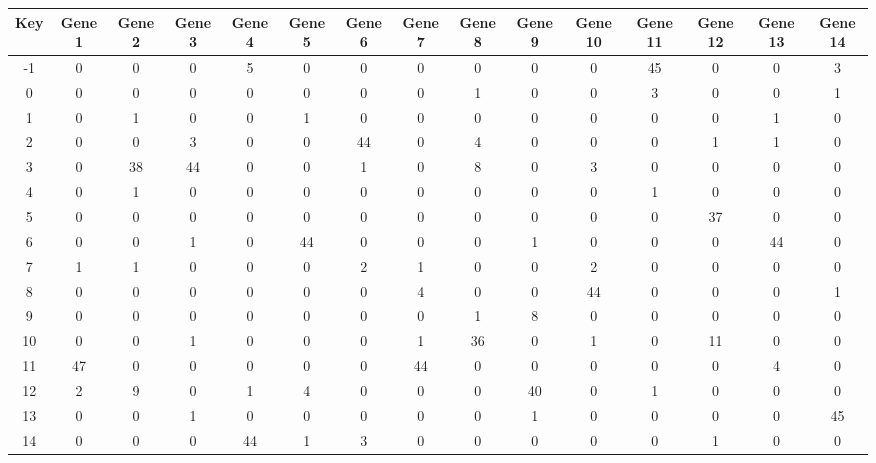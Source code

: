 \begin{tabular}{|c|c|c|c|c|c|c|c|c|c|c|c|c|c|c|}
\hline
Key & Gene 1 & Gene 2 & Gene 3 & Gene 4 & Gene 5 & Gene 6 & Gene 7 & Gene 8 & Gene 9 & Gene 10 & Gene 11 & Gene 12 & Gene 13 & Gene 14 \\
\hline
-1 & 0 & 0 & 0 & 5 & 0 & 0 & 0 & 0 & 0 & 0 & 45 & 0 & 0 & 3 \\
0 & 0 & 0 & 0 & 0 & 0 & 0 & 0 & 1 & 0 & 0 & 3 & 0 & 0 & 1 \\
1 & 0 & 1 & 0 & 0 & 1 & 0 & 0 & 0 & 0 & 0 & 0 & 0 & 1 & 0 \\
2 & 0 & 0 & 3 & 0 & 0 & 44 & 0 & 4 & 0 & 0 & 0 & 1 & 1 & 0 \\
3 & 0 & 38 & 44 & 0 & 0 & 1 & 0 & 8 & 0 & 3 & 0 & 0 & 0 & 0 \\
4 & 0 & 1 & 0 & 0 & 0 & 0 & 0 & 0 & 0 & 0 & 1 & 0 & 0 & 0 \\
5 & 0 & 0 & 0 & 0 & 0 & 0 & 0 & 0 & 0 & 0 & 0 & 37 & 0 & 0 \\
6 & 0 & 0 & 1 & 0 & 44 & 0 & 0 & 0 & 1 & 0 & 0 & 0 & 44 & 0 \\
7 & 1 & 1 & 0 & 0 & 0 & 2 & 1 & 0 & 0 & 2 & 0 & 0 & 0 & 0 \\
8 & 0 & 0 & 0 & 0 & 0 & 0 & 4 & 0 & 0 & 44 & 0 & 0 & 0 & 1 \\
9 & 0 & 0 & 0 & 0 & 0 & 0 & 0 & 1 & 8 & 0 & 0 & 0 & 0 & 0 \\
10 & 0 & 0 & 1 & 0 & 0 & 0 & 1 & 36 & 0 & 1 & 0 & 11 & 0 & 0 \\
11 & 47 & 0 & 0 & 0 & 0 & 0 & 44 & 0 & 0 & 0 & 0 & 0 & 4 & 0 \\
12 & 2 & 9 & 0 & 1 & 4 & 0 & 0 & 0 & 40 & 0 & 1 & 0 & 0 & 0 \\
13 & 0 & 0 & 1 & 0 & 0 & 0 & 0 & 0 & 1 & 0 & 0 & 0 & 0 & 45 \\
14 & 0 & 0 & 0 & 44 & 1 & 3 & 0 & 0 & 0 & 0 & 0 & 1 & 0 & 0 \\
\hline
\end{tabular}